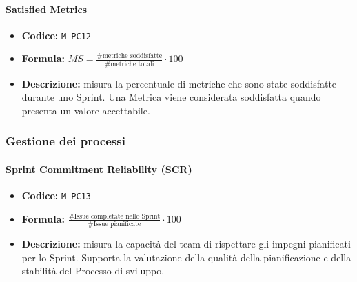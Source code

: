 \documentclass[a4paper,12pt]{article}
\newcommand{\ignoreglossary}{}
\begin{document}
\paragraph{Satisfied Metrics}
\begin{itemize}
    \item \textbf{Codice:} \texttt{M-PC12}
    \item \textbf{Formula:} $MS=\frac{\text{\# metriche soddisfatte}}{\text{\# metriche totali}}\cdot 100$
    \item \textbf{Descrizione:} misura la percentuale di metriche che sono state soddisfatte durante uno Sprint. Una Metrica viene considerata soddisfatta quando presenta un valore accettabile.
\end{itemize}

\subsubsection{Gestione dei processi}
\paragraph{\ignoreglossary{Sprint} Commitment Reliability (SCR)}
\begin{itemize}
    \item \textbf{Codice:} \texttt{M-PC13}
    \item \textbf{Formula:} $\frac{\text{\# Issue completate nello Sprint}}{\text{\# Issue pianificate}} \cdot 100$
    \item \textbf{Descrizione:} misura la capacità del team di rispettare gli impegni pianificati per lo Sprint.
    Supporta la valutazione della qualità della pianificazione e della stabilità del Processo di sviluppo.
\end{itemize}
\end{document}
